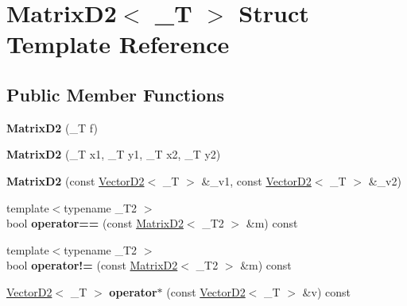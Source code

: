 \hypertarget{struct_matrix_d2}{
\section{MatrixD2$<$ \_\-T $>$ Struct Template Reference}
\label{struct_matrix_d2}
}
\subsection*{Public Member Functions}
\begin{DoxyCompactItemize}
\item 
\hypertarget{struct_matrix_d2_a060f79e85fae95462991a46ceef1ce54}{
{\bfseries MatrixD2} (\_\-T f)}
\label{struct_matrix_d2_a060f79e85fae95462991a46ceef1ce54}

\item 
\hypertarget{struct_matrix_d2_a9c922963a95498fa47f68ebaa8975bf7}{
{\bfseries MatrixD2} (\_\-T x1, \_\-T y1, \_\-T x2, \_\-T y2)}
\label{struct_matrix_d2_a9c922963a95498fa47f68ebaa8975bf7}

\item 
\hypertarget{struct_matrix_d2_adc1690177c303a596edb858ff83d1312}{
{\bfseries MatrixD2} (const \hyperlink{struct_vector_d2}{VectorD2}$<$ \_\-T $>$ \&\_\-v1, const \hyperlink{struct_vector_d2}{VectorD2}$<$ \_\-T $>$ \&\_\-v2)}
\label{struct_matrix_d2_adc1690177c303a596edb858ff83d1312}

\item 
\hypertarget{struct_matrix_d2_a58c1e90e5c276068befc08995aad318c}{
{\footnotesize template$<$typename \_\-T2 $>$ }\\bool {\bfseries operator==} (const \hyperlink{struct_matrix_d2}{MatrixD2}$<$ \_\-T2 $>$ \&m) const }
\label{struct_matrix_d2_a58c1e90e5c276068befc08995aad318c}

\item 
\hypertarget{struct_matrix_d2_a4e3f9feb62b8d75601fd902250ebb245}{
{\footnotesize template$<$typename \_\-T2 $>$ }\\bool {\bfseries operator!=} (const \hyperlink{struct_matrix_d2}{MatrixD2}$<$ \_\-T2 $>$ \&m) const }
\label{struct_matrix_d2_a4e3f9feb62b8d75601fd902250ebb245}

\item 
\hypertarget{struct_matrix_d2_a12c13d98ee44cb12dda242962351118d}{
\hyperlink{struct_vector_d2}{VectorD2}$<$ \_\-T $>$ {\bfseries operator$\ast$} (const \hyperlink{struct_vector_d2}{VectorD2}$<$ \_\-T $>$ \&v) const }
\label{struct_matrix_d2_a12c13d98ee44cb12dda242962351118d}


\end{DoxyCompactItemize}
